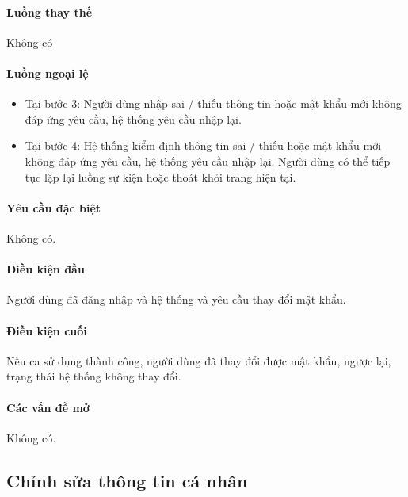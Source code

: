 \documentclass[./../main.tex]{subfiles}
\begin{document}
\paragraph*{Luồng thay thế} Không có

\paragraph*{Luồng ngoại lệ}

\begin{itemize}
	\item

	      Tại bước 3: Người dùng nhập sai / thiếu thông tin hoặc mật khẩu mới
	      không đáp ứng yêu cầu, hệ thống yêu cầu nhập lại.

	\item

	      Tại bước 4: Hệ thống kiểm định thông tin sai / thiếu hoặc mật khẩu mới
	      không đáp ứng yêu cầu, hệ thống yêu cầu nhập lại. Người dùng có thể
	      tiếp tục lặp lại luồng sự kiện hoặc thoát khỏi trang hiện tại.

\end{itemize}

\paragraph*{Yêu cầu đặc biệt}

Không có.

\paragraph*{Điều kiện đầu}

Người dùng đã đăng nhập và hệ thống và yêu cầu thay đổi mật khẩu.

\paragraph*{Điều kiện cuối}

Nếu ca sử dụng thành công, người dùng đã thay đổi được mật khẩu, ngược
lại, trạng thái hệ thống không thay đổi.

\paragraph*{Các vấn đề mở}

Không có.

\subsection{Chỉnh sửa thông tin cá nhân}
\end{document}
